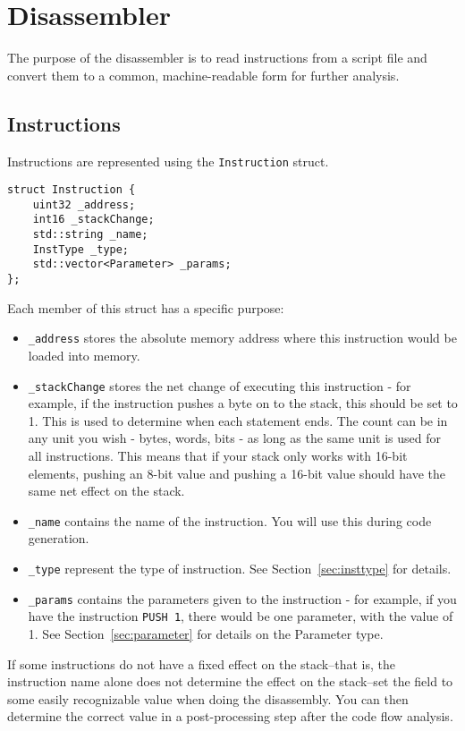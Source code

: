 \section{Disassembler}

The purpose of the disassembler is to read instructions from a script file and convert them to a common, machine-readable form for further analysis.

\subsection{Instructions}
Instructions are represented using the \verb+Instruction+ struct.

\begin{C++}
\begin{lstlisting}
struct Instruction {
	uint32 _address;
	int16 _stackChange;
	std::string _name;
	InstType _type;
	std::vector<Parameter> _params;
};
\end{lstlisting}
\end{C++}

Each member of this struct has a specific purpose:
\begin{itemize}
\item \verb+_address+ stores the absolute memory address where this instruction would be loaded into memory.
\item \verb+_stackChange+ stores the net change of executing this instruction - for example, if the instruction pushes a byte on to the stack, this should be set to 1. This is used to determine when each statement ends. The count can be in any unit you wish - bytes, words, bits - as long as the same unit is used for all instructions. This means that if your stack only works with 16-bit elements, pushing an 8-bit value and pushing a 16-bit value should have the same net effect on the stack.
\item \verb+_name+ contains the name of the instruction. You will use this during code generation.
\item \verb+_type+ represent the type of instruction. See Section~\vref{sec:insttype} for details.
\item \verb+_params+ contains the parameters given to the instruction - for example, if you have the instruction \verb+PUSH 1+, there would be one parameter, with the value of 1. See Section~\vref{sec:parameter} for details on the Parameter type.
\end{itemize}

If some instructions do not have a fixed effect on the stack--that is, the instruction name alone does not determine the effect on the stack--set the field to some easily recognizable value when doing the disassembly. You can then determine the correct value in a post-processing step after the code flow analysis.

